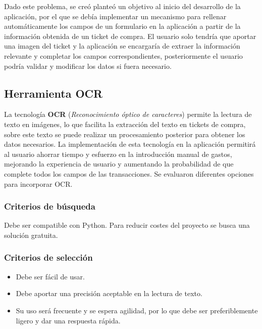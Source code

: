 Dado este problema, se creó planteó un objetivo al inicio del desarrollo de la aplicación, por el que se debía implementar un mecanismo para rellenar automáticamente los campos de un formulario en la aplicación a partir de la información obtenida de un ticket de compra. El usuario solo tendría que aportar una imagen del ticket y la aplicación se encargaría de extraer la información relevante y completar los campos correspondientes, posteriormente el usuario podría validar y modificar los datos si fuera necesario.

\subsection{Herramienta OCR}
La tecnología \textbf{OCR} (\textit{Reconocimiento óptico de caracteres}) permite la lectura de texto en imágenes, lo que facilita la extracción del texto en tickets de compra, sobre este texto se puede realizar un procesamiento posterior para obtener los datos necesarios. La implementación de esta tecnología en la aplicación permitirá al usuario ahorrar tiempo y esfuerzo en la introducción manual de gastos, mejorando la experiencia de usuario y aumentando la probabilidad de que complete todos los campos de las transacciones. Se evaluaron diferentes opciones para incorporar OCR\cite{govindaraju2009guide}.

\subsubsection{Criterios de búsqueda}
Debe ser compatible con Python. Para reducir costes del proyecto se busca una solución gratuita. 

\subsubsection{Criterios de selección}
\begin{itemize}
    \item Debe ser fácil de usar.
    \item Debe aportar una precisión aceptable en la lectura de texto.
    \item Su uso será frecuente y se espera agilidad, por lo que debe ser preferiblemente ligero y dar una respuesta rápida.
\end{itemize}

